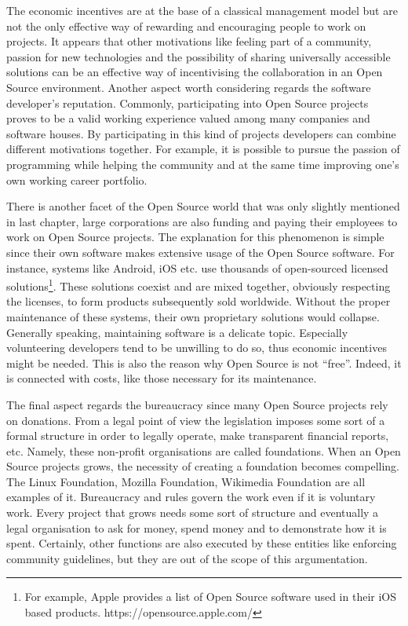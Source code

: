 The economic incentives are at the base of a classical management model but are not the only effective way of rewarding and encouraging people to work on projects. It appears that other motivations like feeling part of a community, passion for new technologies and the possibility of sharing universally accessible solutions can be an effective way of incentivising the collaboration in an Open Source environment.
Another aspect worth considering regards the software developer’s reputation. Commonly, participating into Open Source projects proves to be a valid working experience valued among many companies and software houses. By participating in this kind of projects developers can combine different motivations together. For example, it is possible to pursue the passion of programming while helping the community and at the same time improving one’s own working career portfolio.

There is another facet of the Open Source world that was only slightly mentioned in last chapter, large corporations are also funding and paying their employees to work on Open Source projects. The explanation for this phenomenon is simple since their own software makes extensive usage of the Open Source software. For instance, systems like Android, iOS etc. use thousands of open-sourced licensed solutions\footnote{For example, Apple provides a list of Open Source software used in their iOS based products. https://opensource.apple.com/}. These solutions coexist and are mixed together, obviously respecting the licenses, to form products subsequently sold worldwide.
Without the proper maintenance of these systems, their own proprietary solutions would collapse. Generally speaking, maintaining software is a delicate topic. Especially volunteering developers tend to be unwilling to do so, thus economic incentives might be needed. This is also the reason why Open Source is not “free”. Indeed, it is connected with costs, like those necessary for its maintenance.

The final aspect regards the bureaucracy since many Open Source projects rely on donations. From a legal point of view the legislation imposes some sort of a formal structure in order to legally operate, make transparent financial reports, etc. Namely, these non-profit organisations are called foundations. When an Open Source projects grows, the necessity of creating a foundation becomes compelling. The Linux Foundation, Mozilla Foundation, Wikimedia Foundation are all examples of it. Bureaucracy and rules govern the work even if it is voluntary work. Every project that grows needs some sort of structure and eventually a legal organisation to ask for money, spend money and to demonstrate how it is spent. Certainly, other functions are also executed by these entities like enforcing community guidelines, but they are out of the scope of this argumentation.

